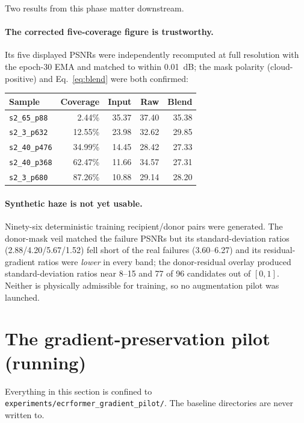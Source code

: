 \documentclass[10pt,a4paper]{article}
\newcommand{\code}[1]{\texttt{#1}}
\begin{document}
Two results from this phase matter downstream.

\paragraph{The corrected five-coverage figure is trustworthy.} Its five displayed PSNRs were
independently recomputed at full resolution with the epoch-30 EMA and matched to within 0.01~dB;
the mask polarity (cloud-positive) and Eq.~\eqref{eq:blend} were both confirmed:

\begin{center}
\begin{tabular}{@{}lrrrr@{}}
\hline
Sample & Coverage & Input & Raw & Blend \\
\hline
\code{s2\_65\_p88} & 2.44\% & 35.37 & 37.40 & 35.38 \\
\code{s2\_3\_p632} & 12.55\% & 23.98 & 32.62 & 29.85 \\
\code{s2\_40\_p476} & 34.99\% & 14.45 & 28.42 & 27.33 \\
\code{s2\_40\_p368} & 62.47\% & 11.66 & 34.57 & 27.31 \\
\code{s2\_3\_p680} & 87.26\% & 10.88 & 29.14 & 28.20 \\
\hline
\end{tabular}
\end{center}

\paragraph{Synthetic haze is not yet usable.} Ninety-six deterministic training recipient/donor
pairs were generated. The donor-mask veil matched the failure PSNRs but its standard-deviation
ratios (2.88/4.20/5.67/1.52) fell short of the real failures (3.60--6.27) and its residual-gradient
ratios were \emph{lower} in every band; the donor-residual overlay produced standard-deviation
ratios near 8--15 and 77 of 96 candidates out of $[0,1]$. Neither is physically admissible for
training, so no augmentation pilot was launched.

\section{The gradient-preservation pilot (running)}
\label{sec:pilot}

Everything in this section is confined to \code{experiments/ecrformer\_gradient\_pilot/}. The
baseline directories are never written to.
\end{document}
